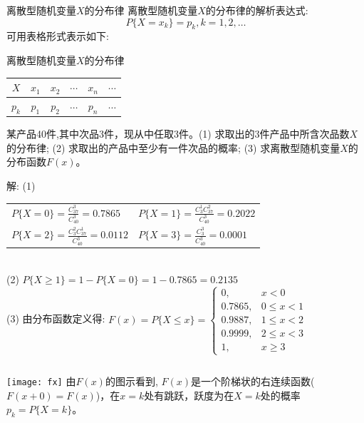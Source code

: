 \begin{frame}{离散型随机变量$X$的分布律}
离散型随机变量$X$的分布律的解析表达式:
	\[P\{X=x_k\}=p_k, k=1,2,\dots\]
可用表格形式表示如下:
\begin{block}{离散型随机变量$X$的分布律}
	\begin{tabular}{c|ccccc}
		$X$ & $x_1$ & $x_2$ & $\cdots$ & $x_n$ & $\cdots$\\ 
		\hline 
		$p_k$ & $p_1$ & $p_2$ & $\cdots$ & $p_n$ & $\cdots$\\ 
	\end{tabular} 
\end{block}

\begin{example}
	某产品40件,其中次品3件，现从中任取3件。(1) 求取出的3件产品中所含次品数$X$的分布律; (2) 求取出的产品中至少有一件次品的概率; (3) 求离散型随机变量$X$的分布函数$F(x)$。
\end{example}
\end{frame}

\begin{frame}
\begin{block}{解:}
(1) \begin{tabular}{ll}
	$P\{X=0\}=\frac{C_{37}^{3}}{C_{40}^{3}}=0.7865$ & $P\{X=1\}=\frac{C_{3}^{1}C_{37}^{2}}{C_{40}^{3}}=0.2022$ \\ 
	$P\{X=2\}=\frac{C_{3}^{2}C_{37}^{1}}{C_{40}^{3}}=0.0112$ & $P\{X=3\}=\frac{C_{3}^{3}}{C_{40}^{3}}=0.0001$ \\ 
\end{tabular}\\ 
(2) \quad $P\{X\ge 1\}=1-P\{X=0\}=1-0.7865=0.2135$\\
(3) 由分布函数定义得:
$F(x)=P\{X\le x\} =
\begin{cases}
0,      & x<0 \\
0.7865, & 0\le x<1 \\
0.9887, & 1\le x<2 \\
0.9999, & 2\le x<3 \\
1,      & x\ge 3
\end{cases} $
\end{block}
\begin{columns}%
	\texttt{[image: fx]}
	由$F(x)$的图示看到, $F(x)$是一个阶梯状的右连续函数($F(x+0)=F(x)$)，在$x=k$处有跳跃，跃度为在$X=k$处的概率$p_k=P\{X=k\}$。	
\end{columns}
\end{frame}

